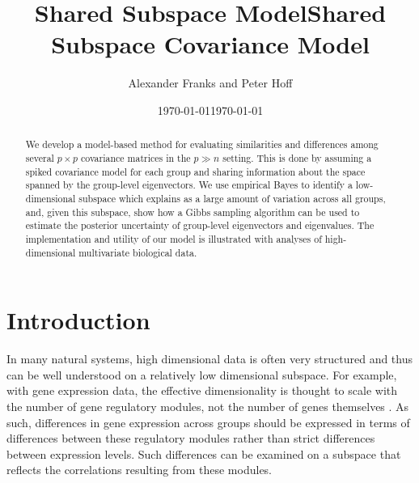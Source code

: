 \documentclass[12pt]{article}
\begin{document}
\title{Shared Subspace Model}


\date{\today}


\title{Shared Subspace Covariance Model}
\author{Alexander Franks and Peter Hoff}
\date{\today}
\maketitle 

\begin{abstract}


  We develop a model-based method for evaluating similarities and
  differences among several $p\times p$ covariance matrices in the
  $p \gg n$ setting.  This is done by assuming a spiked covariance
  model for each group and sharing information about the space spanned
  by the group-level eigenvectors.  We use empirical Bayes to identify
  a low-dimensional subspace which explains as a large amount of
  variation across all groups, and, given this subspace, show how a
  Gibbs sampling algorithm can be used to estimate the posterior
  uncertainty of group-level eigenvectors and eigenvalues.  The
  implementation and utility of our model is illustrated with analyses
  of high-dimensional multivariate biological data.

\end{abstract}

\section{Introduction}

In many natural systems, high dimensional data is often very
structured and thus can be well understood on a relatively low
dimensional subspace. For example, with gene expression data, the
effective dimensionality is thought to scale with the number of gene
regulatory modules, not the number of genes themselves
\citep{Heimberg2016}.  As such, differences in gene expression across
groups should be expressed in terms of differences between these
regulatory modules rather than strict differences between expression
levels.  Such differences can be examined on a subspace that reflects
the correlations resulting from these modules.
\end{document}
